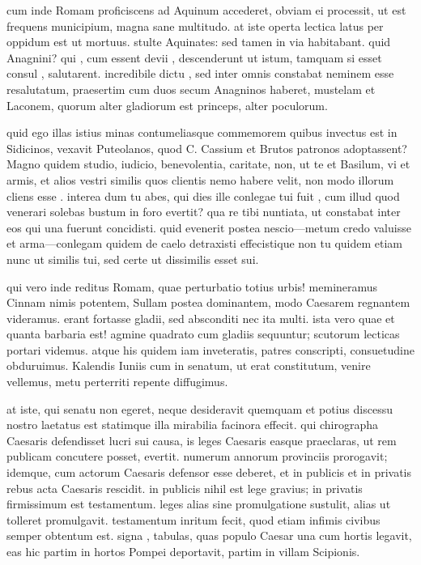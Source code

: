  cum inde Romam proficiscens ad Aquinum accederet, obviam ei processit, ut est frequens municipium, magna sane multitudo. at iste operta lectica latus per oppidum est ut mortuus. stulte Aquinates: sed tamen in via habitabant. quid Anagnini? qui , cum essent devii , descenderunt ut istum, tamquam si esset consul , salutarent. incredibile dictu , sed inter omnis constabat neminem esse resalutatum, praesertim cum duos secum Anagninos haberet, mustelam et Laconem, quorum alter gladiorum est princeps, alter poculorum.

 quid ego illas istius minas contumeliasque commemorem quibus invectus est in Sidicinos, vexavit Puteolanos, quod C. Cassium et Brutos patronos adoptassent? Magno quidem studio, iudicio, benevolentia, caritate, non, ut te et Basilum, vi et armis, et alios vestri similis quos clientis nemo habere velit, non modo illorum cliens esse . interea dum tu abes, qui dies ille conlegae tui fuit , cum illud quod venerari solebas bustum in foro evertit? qua re tibi nuntiata, ut constabat inter eos qui una fuerunt concidisti. quid evenerit postea nescio—metum credo valuisse et arma—conlegam quidem de caelo detraxisti effecistique non tu quidem etiam nunc ut similis tui, sed certe ut dissimilis esset sui.

 qui vero inde reditus Romam, quae perturbatio totius urbis! memineramus Cinnam nimis potentem, Sullam postea dominantem, modo Caesarem regnantem videramus. erant fortasse gladii, sed absconditi nec ita multi. ista vero quae et quanta barbaria est! agmine quadrato cum gladiis sequuntur; scutorum lecticas portari videmus. atque his quidem iam inveteratis, patres conscripti, consuetudine obduruimus. Kalendis Iuniis cum in senatum, ut erat constitutum, venire vellemus, metu perterriti repente diffugimus.

 at iste, qui senatu non egeret, neque desideravit quemquam et potius discessu nostro laetatus est statimque illa mirabilia facinora effecit. qui chirographa Caesaris defendisset lucri sui causa, is leges Caesaris easque praeclaras, ut rem publicam concutere posset, evertit. numerum annorum provinciis prorogavit; idemque, cum actorum Caesaris defensor esse deberet, et in publicis et in privatis rebus acta Caesaris rescidit. in publicis nihil est lege gravius; in privatis firmissimum est testamentum. leges alias sine promulgatione sustulit, alias ut tolleret promulgavit. testamentum inritum fecit, quod etiam infimis civibus semper obtentum est. signa , tabulas, quas populo Caesar una cum hortis legavit, eas hic partim in hortos Pompei deportavit, partim in villam Scipionis.

